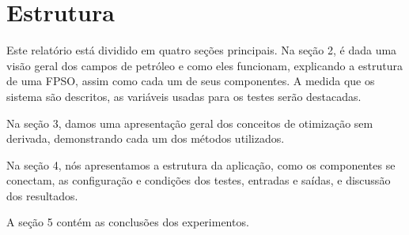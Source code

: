  

\section{Estrutura}

Este relatório está dividido em quatro seções principais.
Na seção 2, é dada uma visão geral dos campos de petróleo e como eles funcionam, explicando a estrutura de uma FPSO, assim como cada um de seus componentes. A medida que os sistema são descritos, as variáveis usadas para os testes serão destacadas.

Na seção 3, damos uma apresentação geral dos conceitos de otimização sem derivada, demonstrando cada um dos métodos utilizados.

Na seção 4, nós apresentamos a estrutura da aplicação, como os componentes se conectam, as configuração e condições dos testes, entradas e saídas, e discussão dos resultados.

A seção 5 contém as conclusões dos experimentos.

 

